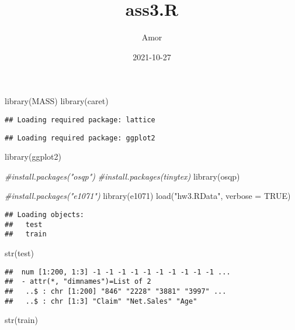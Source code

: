 \documentclass[
]{article}
\title{ass3.R}
\author{Amor}
\date{2021-10-27}
\newenvironment{Shaded}{\begin{snugshade}}{\end{snugshade}}
\newcommand{\AttributeTok}[1]{\textcolor[rgb]{0.77,0.63,0.00}{#1}}
\newcommand{\CommentTok}[1]{\textcolor[rgb]{0.56,0.35,0.01}{\textit{#1}}}
\newcommand{\ConstantTok}[1]{\textcolor[rgb]{0.00,0.00,0.00}{#1}}
\newcommand{\FunctionTok}[1]{\textcolor[rgb]{0.00,0.00,0.00}{#1}}
\newcommand{\NormalTok}[1]{#1}
\newcommand{\StringTok}[1]{\textcolor[rgb]{0.31,0.60,0.02}{#1}}
\begin{document}
\maketitle

\begin{Shaded}
\begin{Highlighting}[]
\FunctionTok{library}\NormalTok{(MASS)}
\FunctionTok{library}\NormalTok{(caret)}
\end{Highlighting}
\end{Shaded}

\begin{verbatim}
## Loading required package: lattice
\end{verbatim}

\begin{verbatim}
## Loading required package: ggplot2
\end{verbatim}

\begin{Shaded}
\begin{Highlighting}[]
\FunctionTok{library}\NormalTok{(ggplot2)}

\CommentTok{\#install.packages("osqp")}
\CommentTok{\#install.packages(\textquotesingle{}tinytex\textquotesingle{})}
\FunctionTok{library}\NormalTok{(osqp)}

\CommentTok{\#install.packages("e1071")}
\FunctionTok{library}\NormalTok{(e1071)}
\FunctionTok{load}\NormalTok{(}\StringTok{"hw3.RData"}\NormalTok{, }\AttributeTok{verbose =} \ConstantTok{TRUE}\NormalTok{)}
\end{Highlighting}
\end{Shaded}

\begin{verbatim}
## Loading objects:
##   test
##   train
\end{verbatim}

\begin{Shaded}
\begin{Highlighting}[]
\FunctionTok{str}\NormalTok{(test)}
\end{Highlighting}
\end{Shaded}

\begin{verbatim}
##  num [1:200, 1:3] -1 -1 -1 -1 -1 -1 -1 -1 -1 -1 ...
##  - attr(*, "dimnames")=List of 2
##   ..$ : chr [1:200] "846" "2228" "3881" "3997" ...
##   ..$ : chr [1:3] "Claim" "Net.Sales" "Age"
\end{verbatim}

\begin{Shaded}
\begin{Highlighting}[]
\FunctionTok{str}\NormalTok{(train)}
\end{Highlighting}
\end{Shaded}
\end{document}
